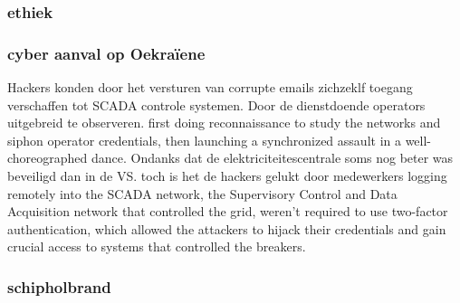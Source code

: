 \subsubsection{ethiek}
 

\subsubsection{ cyber aanval op Oekraïene }


Hackers konden door het versturen van corrupte emails zichzeklf toegang verschaffen tot  SCADA controle systemen. Door de dienstdoende operators uitgebreid te observeren.
first doing reconnaissance to study the networks and siphon operator credentials, then launching a synchronized assault in a well-choreographed dance.
Ondanks dat de elektriciteitescentrale soms nog beter was beveiligd dan in de VS. toch is het de hackers gelukt door medewerkers logging remotely into the SCADA network, the Supervisory Control and Data Acquisition network that controlled the grid, weren't required to use two-factor authentication, which allowed the attackers to hijack their credentials and gain crucial access to systems that controlled the breakers.


 


\subsubsection{schipholbrand}
 



